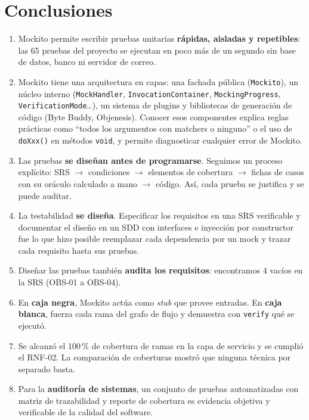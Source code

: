 \documentclass[11pt,a4paper,oneside]{report}
\newcommand{\code}[1]{\texttt{#1}}
\begin{document}
\section{Conclusiones}
\begin{enumerate}
  \item Mockito permite escribir pruebas unitarias \textbf{rápidas, aisladas y repetibles}: las 65 pruebas del proyecto se ejecutan en poco más de un segundo sin base de datos, banco ni servidor de correo.
  \item Mockito tiene una arquitectura en capas: una fachada pública (\code{Mockito}), un núcleo interno (\code{MockHandler}, \code{InvocationContainer}, \code{MockingProgress}, \code{VerificationMode}\ldots), un sistema de plugins y bibliotecas de generación de código (Byte Buddy, Objenesis). Conocer esos componentes explica reglas prácticas como ``todos los argumentos con matchers o ninguno'' o el uso de \code{doXxx()} en métodos \code{void}, y permite diagnosticar cualquier error de Mockito.
  \item Las pruebas \textbf{se diseñan antes de programarse}. Seguimos un proceso explícito: SRS $\rightarrow$ condiciones $\rightarrow$ elementos de cobertura $\rightarrow$ fichas de casos con su oráculo calculado a mano $\rightarrow$ código. Así, cada prueba se justifica y se puede auditar.
  \item La testabilidad \textbf{se diseña}. Especificar los requisitos en una SRS verificable y documentar el diseño en un SDD con interfaces e inyección por constructor fue lo que hizo posible reemplazar cada dependencia por un mock y trazar cada requisito hasta sus pruebas.
  \item Diseñar las pruebas también \textbf{audita los requisitos}: encontramos 4 vacíos en la SRS (OBS-01 a OBS-04).
  \item En \textbf{caja negra}, Mockito actúa como \emph{stub} que provee entradas. En \textbf{caja blanca}, fuerza cada rama del grafo de flujo y demuestra con \code{verify} qué se ejecutó.
  \item Se alcanzó el 100\,\% de cobertura de ramas en la capa de servicio y se cumplió el RNF-02. La comparación de coberturas mostró que ninguna técnica por separado basta.
  \item Para la \textbf{auditoría de sistemas}, un conjunto de pruebas automatizadas con matriz de trazabilidad y reporte de cobertura es evidencia objetiva y verificable de la calidad del software.
\end{enumerate}
\end{document}
